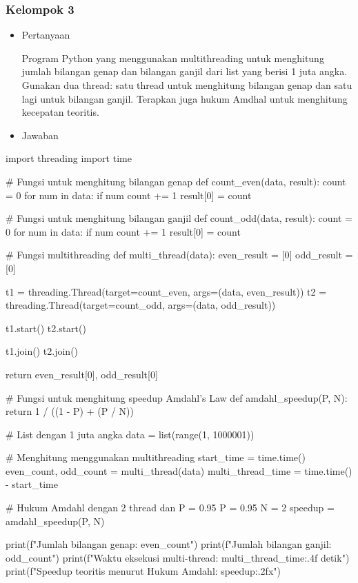 \documentclass[12pt]{article}
\begin{document}
\subsubsection{Kelompok 3}

\begin{itemize}
    \item Pertanyaan
    
    Program Python yang menggunakan multithreading untuk menghitung jumlah bilangan genap dan bilangan ganjil dari list yang berisi 1 juta angka. Gunakan dua thread: satu thread untuk menghitung bilangan genap dan satu lagi untuk bilangan ganjil. Terapkan juga hukum Amdhal untuk menghitung kecepatan teoritis.
\end{itemize}
    
\begin{itemize}
    \item Jawaban
\end{itemize}
\begin{python}
import threading
import time

# Fungsi untuk menghitung bilangan genap
def count_even(data, result):
    count = 0
    for num in data:
        if num %
            count += 1
    result[0] = count

# Fungsi untuk menghitung bilangan ganjil
def count_odd(data, result):
    count = 0
    for num in data:
        if num %
            count += 1
    result[0] = count

# Fungsi multithreading
def multi_thread(data):
    even_result = [0]
    odd_result = [0]

    t1 = threading.Thread(target=count_even, args=(data, even_result))
    t2 = threading.Thread(target=count_odd, args=(data, odd_result))

    t1.start()
    t2.start()

    t1.join()
    t2.join()

    return even_result[0], odd_result[0]

# Fungsi untuk menghitung speedup Amdahl's Law
def amdahl_speedup(P, N):
    return 1 / ((1 - P) + (P / N))

# List dengan 1 juta angka
data = list(range(1, 1000001))

# Menghitung menggunakan multithreading
start_time = time.time()
even_count, odd_count = multi_thread(data)
multi_thread_time = time.time() - start_time

# Hukum Amdahl dengan 2 thread dan P = 0.95
P = 0.95
N = 2
speedup = amdahl_speedup(P, N)

print(f"Jumlah bilangan genap: {even_count}")
print(f"Jumlah bilangan ganjil: {odd_count}")
print(f"Waktu eksekusi multi-thread: {multi_thread_time:.4f} detik")
print(f"Speedup teoritis menurut Hukum Amdahl: {speedup:.2f}x")
\end{python}
\end{document}
